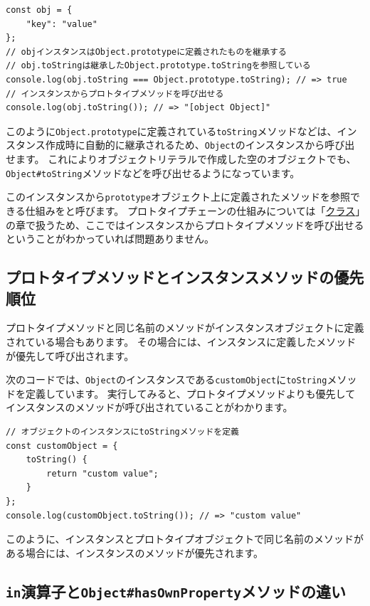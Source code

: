 \begin{lstlisting}
const obj = {
    "key": "value"
};
// objインスタンスはObject.prototypeに定義されたものを継承する
// obj.toStringは継承したObject.prototype.toStringを参照している
console.log(obj.toString === Object.prototype.toString); // => true
// インスタンスからプロトタイプメソッドを呼び出せる
console.log(obj.toString()); // => "[object Object]"
\end{lstlisting}

このように\texttt{Object.prototype}に定義されている\texttt{toString}メソッドなどは、インスタンス作成時に自動的に継承されるため、\texttt{Object}のインスタンスから呼び出せます。
これによりオブジェクトリテラルで作成した空のオブジェクトでも、\texttt{Object\#toString}メソッドなどを呼び出せるようになっています。

このインスタンスから\texttt{prototype}オブジェクト上に定義されたメソッドを参照できる仕組みを\textbf{}と呼びます。
プロトタイプチェーンの仕組みについては「\hyperlink{class}{クラス}」の章で扱うため、ここではインスタンスからプロトタイプメソッドを呼び出せるということがわかっていれば問題ありません。

\hypertarget{same-method-name-order}{%
\subsection{プロトタイプメソッドとインスタンスメソッドの優先順位}\label{same-method-name-order}}

プロトタイプメソッドと同じ名前のメソッドがインスタンスオブジェクトに定義されている場合もあります。
その場合には、インスタンスに定義したメソッドが優先して呼び出されます。

次のコードでは、\texttt{Object}のインスタンスである\texttt{customObject}に\texttt{toString}メソッドを定義しています。
実行してみると、プロトタイプメソッドよりも優先してインスタンスのメソッドが呼び出されていることがわかります。

\begin{lstlisting}
// オブジェクトのインスタンスにtoStringメソッドを定義
const customObject = {
    toString() {
        return "custom value";
    }
};
console.log(customObject.toString()); // => "custom value"
\end{lstlisting}

このように、インスタンスとプロトタイプオブジェクトで同じ名前のメソッドがある場合には、インスタンスのメソッドが優先されます。

\hypertarget{diff-in-operator-and-hasOwnProperty}{%
\subsection{\texorpdfstring{\texttt{in}演算子と\texttt{Object\#hasOwnProperty}メソッドの違い}{in演算子とObject\#hasOwnPropertyメソッドの違い}}\label{diff-in-operator-and-hasOwnProperty}}

